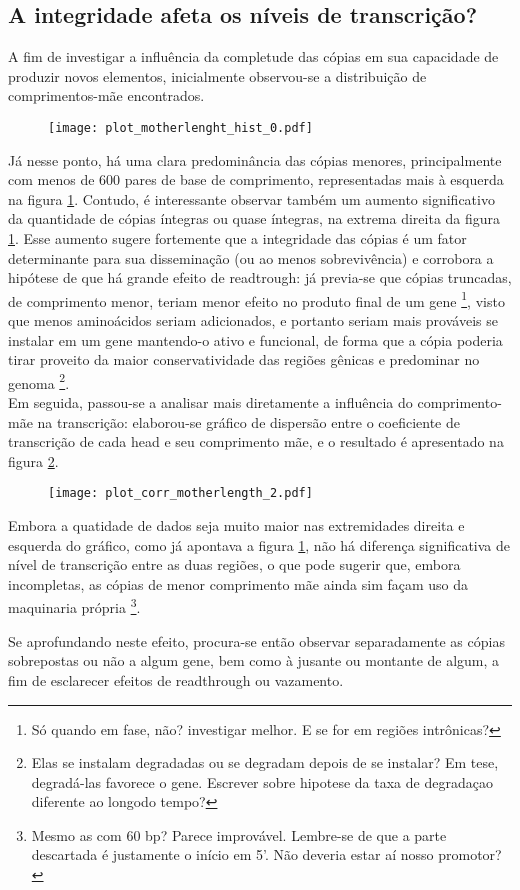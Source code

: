 \documentclass{article}
\begin{document}
\begin{multicols}{2}
\subsection{A integridade afeta os níveis de transcrição?}

A fim de investigar a influência da completude das cópias em sua capacidade de produzir novos elementos, inicialmente observou-se a distribuição de comprimentos-mãe encontrados.\\

\begin{figure}[H]
  \label{mlhist}
  \centering
  \texttt{[image: plot\_motherlenght\_hist\_0.pdf]}
\end{figure}

Já nesse ponto, há uma clara predominância das cópias menores, principalmente com menos de 600 pares de base de comprimento, representadas mais à esquerda na figura \ref{mlhist}. Contudo, é interessante observar também um aumento significativo da quantidade de cópias íntegras ou quase íntegras, na extrema direita da figura \ref{mlhist}. Esse aumento sugere fortemente que a integridade das cópias é um fator determinante para sua disseminação (ou ao menos sobrevivência) e corrobora a hipótese de que há grande efeito de readtrough: já previa-se que cópias truncadas, de comprimento menor, teriam menor efeito no produto final de um gene \footnote{Só quando em fase, não? investigar melhor. E se for em regiões intrônicas?}, visto que menos aminoácidos seriam adicionados, e portanto seriam mais prováveis se instalar em um gene mantendo-o ativo e funcional, de forma que a cópia poderia tirar proveito da maior conservatividade das regiões gênicas e predominar no genoma \footnote{Elas se instalam degradadas ou se degradam depois de se instalar? Em tese, degradá-las favorece o gene. Escrever sobre hipotese da taxa de degradaçao diferente ao longodo tempo?}.\\

Em seguida, passou-se a analisar mais diretamente a influência do comprimento-mãe na transcrição: elaborou-se gráfico de dispersão entre o coeficiente de transcrição de cada head e seu comprimento mãe, e o resultado é apresentado na figura \ref{mlrc}.

\begin{figure}[H]
	\centering
	\label{mlrc}
	\texttt{[image: plot\_corr\_motherlength\_2.pdf]}
\end{figure}

	Embora a quatidade de dados seja muito maior nas extremidades direita e esquerda do gráfico, como já apontava a figura \ref{mlhist}, não há diferença significativa de nível de transcrição entre as duas regiões, o que pode sugerir que, embora incompletas, as cópias de menor comprimento mãe ainda sim façam uso da maquinaria própria \footnote{Mesmo as com 60 bp? Parece improvável. Lembre-se de que a parte descartada é justamente o início em 5'. Não deveria estar aí nosso promotor?}.

Se aprofundando neste efeito, procura-se então observar separadamente as cópias sobrepostas ou não a algum gene, bem como à jusante ou montante de algum, a fim de esclarecer efeitos de readthrough ou vazamento.


\end{multicols}
\end{document}
